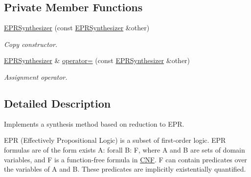 \subsection*{Private Member Functions}
\begin{DoxyCompactItemize}
\item 
\hyperlink{classEPRSynthesizer_a50010185f31a7d17a2082d2fe81a0aa9}{E\-P\-R\-Synthesizer} (const \hyperlink{classEPRSynthesizer}{E\-P\-R\-Synthesizer} \&other)
\begin{DoxyCompactList}\small\item\em Copy constructor. \end{DoxyCompactList}\item 
\hyperlink{classEPRSynthesizer}{E\-P\-R\-Synthesizer} \& \hyperlink{classEPRSynthesizer_a3edccf1e4b274eb7ac1f2bbefa2e4d0b}{operator=} (const \hyperlink{classEPRSynthesizer}{E\-P\-R\-Synthesizer} \&other)
\begin{DoxyCompactList}\small\item\em Assignment operator. \end{DoxyCompactList}\end{DoxyCompactItemize}


\subsection{Detailed Description}
Implements a synthesis method based on reduction to E\-P\-R. 

E\-P\-R (Effectively Propositional Logic) is a subset of first-\/order logic. E\-P\-R formulas are of the form exists A\-: forall B\-: F, where A and B are sets of domain variables, and F is a function-\/free formula in \hyperlink{classCNF}{C\-N\-F}. F can contain predicates over the variables of A and B. These predicates are implicitly existentially quantified.


